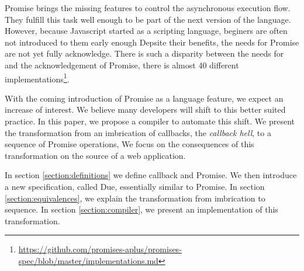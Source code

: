Promise brings the missing features to control the asynchronous execution flow.
They fulfill this task well enough to be part of the next version of the language.
However, because Javascript started as a scripting language, beginers are often not introduced to them early enough
Depsite their benefits, the needs for Promise are not yet fully acknowledge.
There is such a disparity between the needs for and the acknowledgement of Promise, there is almost 40 different implementations\footnote{\url{https://github.com/promises-aplus/promises-spec/blob/master/implementations.md}}.




With the coming introduction of Promise as a language feature, we expect an increase of interest.
We believe many developers will shift to this better suited practice.
In this paper, we propose a compiler to automate this shift.
We present the transformation from an imbrication of callbacks, the \textit{callback hell}, to a sequence of Promise operations,
We focus on the consequences of this transformation on the source of a web application.

In section \ref{section:definitions} we define callback and Promise.
We then introduce a new specification, called Due, essentially similar to Promise.
In section \ref{section:equivalences}, we explain the transformation from imbrication to sequence.
In section \ref{section:compiler}, we present an implementation of this transformation.

